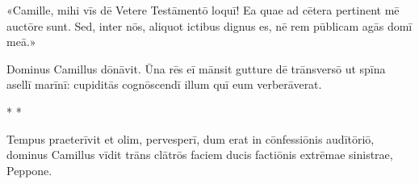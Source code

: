 \documentclass[a4paper, 12pt]{article}
\newcommand{\sta}{
	\begin{center}
		\Large * * *
	\end{center}
}
\begin{document}
	«Camille, mihi vīs dē Vetere Testāmentō loquī!
	Ea quae ad cētera pertinent mē auctōre sunt.
	Sed, inter nōs, aliquot ictibus dignus es, nē rem pūblicam agās domī meā.»
	
	Dominus Camillus dōnāvit.
	Ūna rēs eī mānsit gutture dē trānsversō ut spīna asellī marīnī: cupiditās cognōscendī illum quī eum verberāverat.
	
	\sta
	
	Tempus praeterīvit et olim, pervesperī, dum erat in cōnfessiōnis audītōriō, dominus Camillus vīdit trāns clātrōs faciem ducis factiōnis extrēmae sinistrae, Peppone.
	
\end{document}
